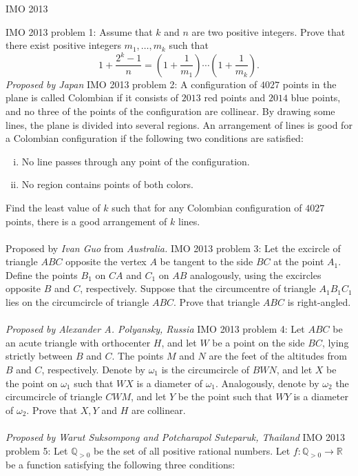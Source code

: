 IMO 2013 

IMO 2013 problem 1:  Assume that $k$ and $n$ are two positive integers. Prove that there exist positive integers $m_1 , \dots , m_k$ such that
\[ 1+\frac{2^k-1}{n}=\left(1+\frac1{m_1}\right)\cdots \left(1+\frac1{m_k}\right). \]
\textit{Proposed by Japan} 
IMO 2013 problem 2:  A configuration of $4027$ points in the plane is called Colombian if it consists of $2013$ red points and $2014$ blue points, and no three of the points of the configuration are collinear. By drawing some lines, the plane is divided into several regions. An arrangement of lines is good for a Colombian configuration if the following two conditions are satisfied:
\begin{enumerate}[i)]
  \item No line passes through any point of the configuration.
  \item No region contains points of both colors.
\end{enumerate}
Find the least value of $k$ such that for any Colombian configuration of $4027$ points, there is a good arrangement of $k$ lines. \\\\
Proposed by \textit{Ivan Guo} from \textit{Australia.} 
IMO 2013 problem 3:  Let the excircle of triangle $ABC$ opposite the vertex $A$ be tangent to the side $BC$ at the point $A_1$. Define the points $B_1$ on $CA$ and $C_1$ on $AB$ analogously, using the excircles opposite $B$ and $C$, respectively. Suppose that the circumcentre of triangle $A_1B_1C_1$ lies on the circumcircle of triangle $ABC$. Prove that triangle $ABC$ is right-angled. \\\\
\textit{Proposed by Alexander A. Polyansky, Russia} 
IMO 2013 problem 4:  Let $ABC$ be an acute triangle with orthocenter $H$, and let $W$ be a point on the side $BC$, lying strictly between $B$ and $C$. The points $M$ and $N$ are the feet of the altitudes from $B$ and $C$, respectively. Denote by $\omega_1$ is the circumcircle of $BWN$, and let $X$ be the point on $\omega_1$ such that $WX$ is a diameter of $\omega_1$. Analogously, denote by $\omega_2$ the circumcircle of triangle $CWM$, and let $Y$ be the point such that $WY$ is a diameter of $\omega_2$. Prove that $X,Y$ and $H$ are collinear. \\\\
\textit{Proposed by Warut Suksompong and Potcharapol Suteparuk, Thailand} 
IMO 2013 problem 5:  Let $\mathbb Q_{>0}$ be the set of all positive rational numbers. Let $f:\mathbb Q_{>0}\to\mathbb R$ be a function satisfying the following three conditions:
